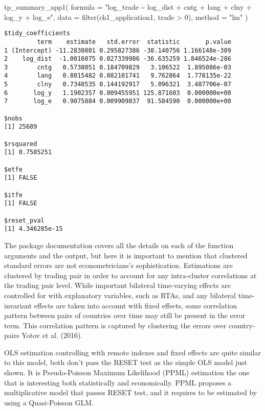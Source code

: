 \documentclass[12pt,reqno,oneside,pdftex]{formato-puc/puctesis} %
\newenvironment{Shaded}{\begin{snugshade}}{\end{snugshade}}
\newcommand{\AttributeTok}[1]{\textcolor[rgb]{0.77,0.63,0.00}{#1}}
\newcommand{\DecValTok}[1]{\textcolor[rgb]{0.00,0.00,0.81}{#1}}
\newcommand{\FunctionTok}[1]{\textcolor[rgb]{0.00,0.00,0.00}{#1}}
\newcommand{\NormalTok}[1]{#1}
\newcommand{\SpecialCharTok}[1]{\textcolor[rgb]{0.00,0.00,0.00}{#1}}
\newcommand{\StringTok}[1]{\textcolor[rgb]{0.31,0.60,0.02}{#1}}
\begin{document}
\begin{Shaded}
\begin{Highlighting}[]
\FunctionTok{tp\_summary\_app1}\NormalTok{(}
  \AttributeTok{formula =} \StringTok{"log\_trade \textasciitilde{} log\_dist + cntg + lang + clny + log\_y + log\_e"}\NormalTok{,}
  \AttributeTok{data =} \FunctionTok{filter}\NormalTok{(ch1\_application1, trade }\SpecialCharTok{\textgreater{}} \DecValTok{0}\NormalTok{),}
  \AttributeTok{method =} \StringTok{"lm"}
\NormalTok{)}
\end{Highlighting}
\end{Shaded}

\begin{verbatim}
$tidy_coefficients
         term    estimate   std.error  statistic       p.value
1 (Intercept) -11.2830801 0.295827386 -38.140756 1.166148e-309
2    log_dist  -1.0016075 0.027339986 -36.635259 1.846524e-286
3        cntg   0.5738051 0.184709829   3.106522  1.895086e-03
4        lang   0.8015482 0.082101741   9.762864  1.778135e-22
5        clny   0.7348535 0.144192917   5.096321  3.487706e-07
6       log_y   1.1902357 0.009455951 125.871603  0.000000e+00
7       log_e   0.9075884 0.009909837  91.584590  0.000000e+00

$nobs
[1] 25689

$rsquared
[1] 0.7585251

$etfe
[1] FALSE

$itfe
[1] FALSE

$reset_pval
[1] 4.346285e-15
\end{verbatim}

The package documentation covers all the details on each of the function
arguments and the output, but here it is important to mention that
clustered standard errors are not econometricians's sophistication.
Estimations are clustered by trading pair in order to account for any
intra-cluster correlations at the trading pair level. While important
bilateral time-varying effects are controlled for with explanatory
variables, such as RTAs, and any bilateral time-invariant effects are
taken into account with fixed effects, some correlation pattern between
pairs of countries over time may still be present in the error term.
This correlation pattern is captured by clustering the errors over
country-pairs Yotov et al. (2016).

OLS estimation controlling with remote indexes and fixed effects are
quite similar to this model, both don't pass the RESET test as the
simple OLS model just shown. It is Pseudo-Poisson Maximum Likelihood
(PPML) estimation the one that is interesting both statistically and
economically. PPML proposes a multiplicative model that passes RESET
test, and it requires to be estimated by using a Quasi-Poisson GLM.
\end{document}
